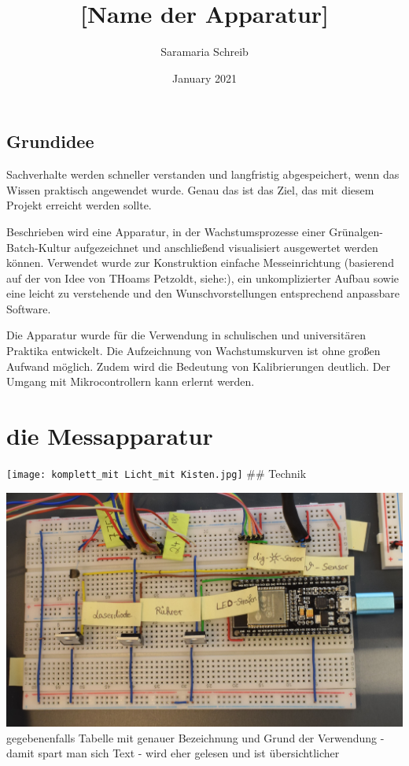 \documentclass[
]{article}
\title{{[}Name der Apparatur{]}}
\author{Saramaria Schreib}
\date{January 2021}
\begin{document}
\maketitle

\hypertarget{grundidee}{%
\subsection{Grundidee}\label{grundidee}}

Sachverhalte werden schneller verstanden und langfristig abgespeichert,
wenn das Wissen praktisch angewendet wurde. Genau das ist das Ziel, das
mit diesem Projekt erreicht werden sollte.

Beschrieben wird eine Apparatur, in der Wachstumsprozesse einer
Grünalgen-Batch-Kultur aufgezeichnet und anschließend visualisiert
ausgewertet werden können. Verwendet wurde zur Konstruktion einfache
Messeinrichtung (basierend auf der von Idee von THoams Petzoldt,
siehe:), ein unkomplizierter Aufbau sowie eine leicht zu verstehende und
den Wunschvorstellungen entsprechend anpassbare Software.

Die Apparatur wurde für die Verwendung in schulischen und universitären
Praktika entwickelt. Die Aufzeichnung von Wachstumskurven ist ohne
großen Aufwand möglich. Zudem wird die Bedeutung von Kalibrierungen
deutlich. Der Umgang mit Mikrocontrollern kann erlernt werden.

\hypertarget{die-messapparatur}{%
\section{die Messapparatur}\label{die-messapparatur}}

\texttt{[image: komplett\_mit Licht\_mit Kisten.jpg]} \#\# Technik

\includegraphics{Controller_Steckbrett.jpg} gegebenenfalls Tabelle mit
genauer Bezeichnung und Grund der Verwendung - damit spart man sich Text
- wird eher gelesen und ist übersichtlicher
\end{document}
